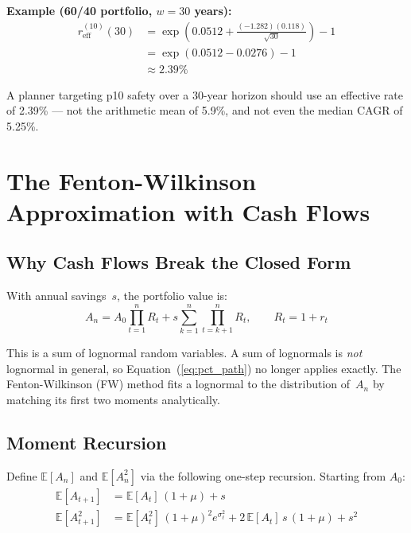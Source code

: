 \documentclass[11pt,letterpaper]{article}
\begin{document}
\noindent\textbf{Example (60/40 portfolio, $w = 30$ years):}
\begin{align*}
r_{\text{eff}}^{(10)}(30) &= \exp\!\left(0.0512 + \frac{(-1.282)(0.118)}{\sqrt{30}}\right) - 1 \\
                          &= \exp\!\left(0.0512 - 0.0276\right) - 1 \\
                          &\approx \mathbf{2.39\%}
\end{align*}

A planner targeting p10 safety over a 30-year horizon should use an effective rate of 2.39\% --- not the arithmetic mean of 5.9\%, and not even the median CAGR of 5.25\%.

\section{The Fenton-Wilkinson Approximation with Cash Flows}

\subsection{Why Cash Flows Break the Closed Form}

With annual savings~$s$, the portfolio value is:
\begin{equation}
A_n = A_0\prod_{t=1}^n R_t + s\sum_{k=1}^n \prod_{t=k+1}^n R_t, \qquad R_t = 1 + r_t
\end{equation}

This is a sum of lognormal random variables. A sum of lognormals is \emph{not} lognormal in general, so Equation~(\ref{eq:pct_path}) no longer applies exactly. The Fenton-Wilkinson (FW) method fits a lognormal to the distribution of~$A_n$ by matching its first two moments analytically.

\subsection{Moment Recursion}

Define $\mathbb{E}[A_n]$ and $\mathbb{E}[A_n^2]$ via the following one-step recursion. Starting from $A_0$:
\begin{align}
\mathbb{E}[A_{t+1}] &= \mathbb{E}[A_t]\,(1 + \mu) + s \label{eq:mean_rec}\\
\mathbb{E}[A_{t+1}^2] &= \mathbb{E}[A_t^2]\,(1+\mu)^2 e^{\sigma_\ell^2} + 2\,\mathbb{E}[A_t]\,s\,(1+\mu) + s^2 \label{eq:var_rec}
\end{align}
\end{document}
